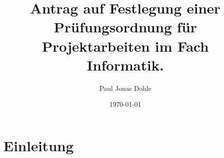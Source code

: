 \documentclass[a4paper,12pt]{article}
\title{Antrag auf Festlegung einer Prüfungsordnung für Projektarbeiten im Fach Informatik.}
\author{Paul Jonas Dohle}
\date{\today}
\begin{document}
\maketitle
\newpage

\tableofcontents
\newpage

\section{Einleitung}
\end{document}
